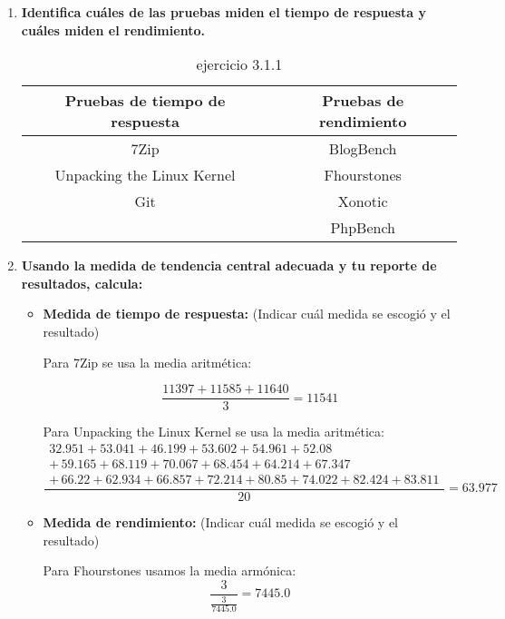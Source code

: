 \documentclass[12pt]{article}
\newcommand{\pl}[1]{\item \textbf{ #1 }}
\begin{document}
\begin{enumerate}[label=(\arabic{section}.\arabic{subsection}.\arabic{enumi})]
    \pl{Identifica cuáles de las pruebas miden el tiempo de respuesta y cuáles miden el rendimiento.}
    \begin{table}[htb]
        \centering
        \begin{tabular}{|c|c|}
        \hline
        Pruebas de tiempo de respuesta & Pruebas de rendimiento \\
        \hline
        7Zip  & BlogBench\\
        \hline
        Unpacking the Linux Kernel & Fhourstones \\
        \hline
        Git & Xonotic \\
        \hline
        & PhpBench \\
        \hline
        \end{tabular}
        \caption{ejercicio 3.1.1}
    \end{table}\par

    \pl{Usando la medida de tendencia central adecuada y tu reporte de resultados, calcula:}
    \begin{itemize}
        \pl{Medida de tiempo de respuesta:}(Indicar cuál medida se escogió y el resultado)\par
    Para 7Zip se usa la media aritmética:\par
        \begin{equation*}
            \frac{11397+11585+11640}{3}=11541
        \end{equation*}

        \vspace{0.5cm}
        Para Unpacking the Linux Kernel se usa la media aritmética:
        \[
        \frac{\begin{split}
            32.951 + 53.041 + 46.199 + 53.602 + 54.961 + 52.08 \\
            + \, 59.165 + 68.119 + 70.067 + 68.454 + 64.214 + 67.347 \\
            + \, 66.22 + 62.934 + 66.857 + 72.214 + 80.85 + 74.022 + 82.424 + 83.811
        \end{split}}{20} = 63.977
        \]
        \pl{Medida de rendimiento:} (Indicar cuál medida se escogió y el resultado)\par
        Para Fhourstones usamos la media armónica:
        \begin{equation*}
            \frac{3}{\frac{3}{7445.0}} = 7445.0
        \end{equation*}


\end{itemize}
\end{enumerate}
\end{document}
